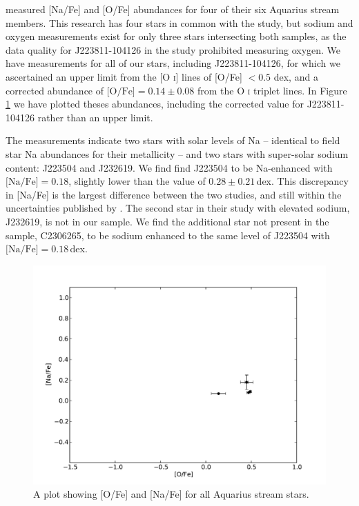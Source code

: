\documentclass{emulateapj}
\begin{document}
\citet{wylie-de-boer;et-al_2012} measured [Na/Fe] and [O/Fe] abundances for four of their six Aquarius stream members. This research has four stars in common with the \citet{wylie-de-boer;et-al_2012} study, but sodium and oxygen measurements exist for only three stars intersecting both samples, as the data quality for J223811-104126 in the \citet{wylie-de-boer;et-al_2012} study prohibited measuring oxygen. We have measurements for all of our stars, including J223811-104126, for which we ascertained an upper limit from the [O \textsc{i}] lines of [O/Fe] $< 0.5$ dex, and a corrected abundance of $\mbox{[O/Fe]} = 0.14 \pm 0.08$ from the O \textsc{i} triplet lines. In Figure \ref{fig:o-na} we have plotted theses abundances, including the corrected value for J223811-104126 rather than an upper limit.





The \citet{wylie-de-boer;et-al_2012} measurements indicate two stars with solar levels of Na \--- identical to field star Na abundances for their metallicity \--- and two stars with super-solar sodium content: J223504 and J232619.
We find find J223504 to be Na-enhanced with $\mbox{[Na/Fe]} = 0.18$, slightly lower than the \citet{wylie-de-boer;et-al_2012} value of $0.28 \pm 0.21$\,dex. This discrepancy in [Na/Fe] is the largest difference between the two studies, and still within the uncertainties published by \citet{wylie-de-boer;et-al_2012}. The second star in their study with elevated sodium, J232619, is not in our sample. We find the additional star not present in the \citet{wylie-de-boer;et-al_2012} sample, C2306265, to be sodium enhanced to the same level of J223504 with $\mbox{[Na/Fe]} = 0.18$\,dex.

\begin{figure}[h]
	\includegraphics[width=\columnwidth]{./figures/aquarius-o-na.pdf}
	\caption{A plot showing [O/Fe] and [Na/Fe] for all Aquarius stream stars.}
	\label{fig:o-na}
\end{figure}
\end{document}
